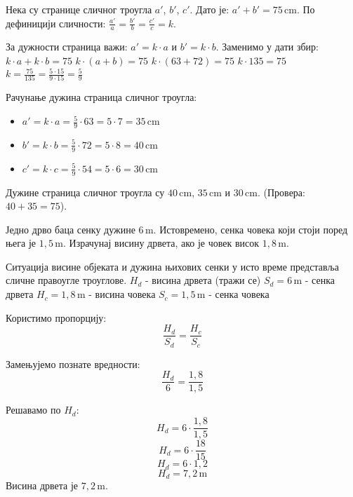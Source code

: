 \documentclass[11pt,a5paper,addpoints]{exam}
\def\measure#1#2{#1 \, \mathrm{#2}}
\begin{document}
\begin{questions}
\begin{solution}[\stretch 8]
  Нека су странице сличног троугла $a'$, $b'$, $c'$.
  Дато је: $a'+b' = 75\,\mathrm{cm}$.
  По дефиницији сличности: $\frac{a'}{a} = \frac{b'}{b} = \frac{c'}{c} = k$.

  За дужности страница важи: $a' = k \cdot a$ и $b' = k \cdot b$.
  Заменимо у дати збир:
  $k \cdot a + k \cdot b = 75$
  $k \cdot (a + b) = 75$
  $k \cdot (63 + 72) = 75$
  $k \cdot 135 = 75$
  $k = \frac{75}{135} = \frac{5 \cdot 15}{9 \cdot 15} = \frac{5}{9}$

  Рачунање дужина страница сличног троугла:
  \begin{itemize}
      \item $a' = k \cdot a = \frac{5}{9} \cdot 63 = 5 \cdot 7 = \measure{35}{cm}$
      \item $b' = k \cdot b = \frac{5}{9} \cdot 72 = 5 \cdot 8 = \measure{40}{cm}$
      \item $c' = k \cdot c = \frac{5}{9} \cdot 54 = 5 \cdot 6 = \measure{30}{cm}$
  \end{itemize}
  Дужине страница сличног троугла су $\measure{40}{cm}$, $\measure{35}{cm}$ и $\measure{30}{cm}$. (Провера: $40+35=75$).
 \end{solution}
 \answerline

\ifprintanswers\else\newpage\fi %

\question[4]
 Једно дрво баца сенку дужине
 $\measure{6}{m}$.
 Истовремено, сенка човека који стоји поред њега је
 $\measure{1{,}5}{m}$.
 Израчунај висину дрвета, ако је човек висок
 $\measure{1{,}8}{m}$.
 \begin{solution}[\stretch 5] %
  Ситуација висине објеката и дужина њихових сенки у исто време представља сличне правоугле троуглове.
  $H_d$ - висина дрвета (тражи се)
  $S_d = \measure{6}{m}$ - сенка дрвета
  $H_c = \measure{1{,}8}{m}$ - висина човека
  $S_c = \measure{1{,}5}{m}$ - сенка човека

  Користимо пропорцију:
  $$ \frac{H_d}{S_d} = \frac{H_c}{S_c} $$

  Замењујемо познате вредности:
  $$ \frac{H_d}{6} = \frac{1{,}8}{1{,}5} $$

  Решавамо по $H_d$:
  $$ H_d = 6 \cdot \frac{1{,}8}{1{,}5} $$
  $$ H_d = 6 \cdot \frac{18}{15} $$
  $$ H_d = 6 \cdot 1{,}2 $$
  $$ H_d = \measure{7{,}2}{m} $$
  Висина дрвета је $\measure{7{,}2}{m}$.
 \end{solution}
 \answerline


\end{questions}
\end{document}
